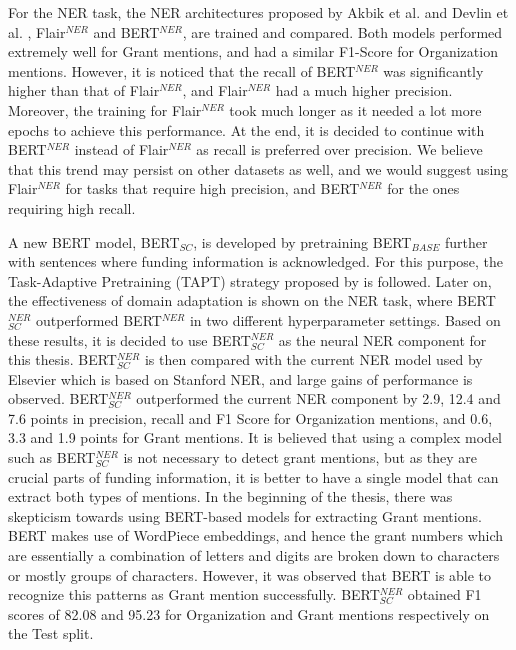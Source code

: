 \documentclass{report}
\theoremstyle{definition}
\theoremstyle{remark}
\begin{document}
For the NER task, the NER architectures proposed by Akbik et al. \cite{flairpaper} and Devlin et al. \cite{BERT}, Flair$^{NER}$ and BERT$^{NER}$, are trained and compared. Both models performed extremely well for Grant mentions, and had a similar F1-Score for Organization mentions. However, it is noticed that the recall of BERT$^{NER}$ was significantly higher than that of Flair$^{NER}$, and Flair$^{NER}$ had a much higher precision. Moreover, the training for Flair$^{NER}$ took much longer as it needed a lot more epochs to achieve this performance. At the end, it is decided to continue with BERT$^{NER}$ instead of Flair$^{NER}$ as recall is preferred over precision. We believe that this trend may persist on other datasets as well, and we would suggest using Flair$^{NER}$ for tasks that require high precision, and BERT$^{NER}$ for the ones requiring high recall.

A new BERT model, BERT$_{SC}$, is developed by pretraining BERT$_{BASE}$ further with sentences where funding information is acknowledged. For this purpose, the Task-Adaptive Pretraining (TAPT) strategy proposed by \cite{DontStop} is followed. Later on, the effectiveness of domain adaptation is shown on the NER task, where BERT$_{SC}^{NER}$ outperformed BERT$^{NER}$ in two different hyperparameter settings. Based on these results, it is decided to use BERT$_{SC}^{NER}$ as the neural NER component for this thesis. BERT$_{SC}^{NER}$ is then compared with the current NER model used by Elsevier which is based on Stanford NER, and large gains of performance is observed. BERT$_{SC}^{NER}$ outperformed the current NER component by 2.9, 12.4 and 7.6 points in precision, recall and F1 Score for Organization mentions, and 0.6, 3.3 and 1.9 points for Grant mentions. It is believed that using a complex model such as BERT$_{SC}^{NER}$ is not necessary to detect grant mentions, but as they are crucial parts of funding information, it is better to have a single model that can extract both types of mentions. In the beginning of the thesis, there was skepticism towards using BERT-based models for extracting Grant mentions. BERT makes use of WordPiece embeddings, and hence the grant numbers which are essentially a combination of letters and digits are broken down to characters or mostly groups of characters. However, it was observed that BERT is able to recognize this patterns as Grant mention successfully. BERT$_{SC}^{NER}$ obtained F1 scores of 82.08 and 95.23 for Organization and Grant mentions respectively on the Test split.
\end{document}
